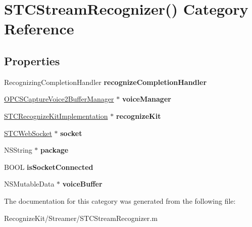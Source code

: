 \hypertarget{category_s_t_c_stream_recognizer_07_08}{}\section{S\+T\+C\+Stream\+Recognizer() Category Reference}
\label{category_s_t_c_stream_recognizer_07_08}
\subsection*{Properties}
\begin{DoxyCompactItemize}
\item 
\hypertarget{category_s_t_c_stream_recognizer_07_08_acbd8a13bbc49366b615f8d2462a12acc}{}\label{category_s_t_c_stream_recognizer_07_08_acbd8a13bbc49366b615f8d2462a12acc} 
Recognizing\+Completion\+Handler {\bfseries recognize\+Completion\+Handler}
\item 
\hypertarget{category_s_t_c_stream_recognizer_07_08_a059267852d040de574a1b94eed567d87}{}\label{category_s_t_c_stream_recognizer_07_08_a059267852d040de574a1b94eed567d87} 
\hyperlink{interface_o_p_c_s_capture_voice2_buffer_manager}{O\+P\+C\+S\+Capture\+Voice2\+Buffer\+Manager} $\ast$ {\bfseries voice\+Manager}
\item 
\hypertarget{category_s_t_c_stream_recognizer_07_08_a4436af5c54b139df184e39c5183bc541}{}\label{category_s_t_c_stream_recognizer_07_08_a4436af5c54b139df184e39c5183bc541} 
\hyperlink{interface_s_t_c_recognize_kit_implementation}{S\+T\+C\+Recognize\+Kit\+Implementation} $\ast$ {\bfseries recognize\+Kit}
\item 
\hypertarget{category_s_t_c_stream_recognizer_07_08_afc91c146cb77eaa94e99633057712357}{}\label{category_s_t_c_stream_recognizer_07_08_afc91c146cb77eaa94e99633057712357} 
\hyperlink{interface_s_t_c_web_socket}{S\+T\+C\+Web\+Socket} $\ast$ {\bfseries socket}
\item 
\hypertarget{category_s_t_c_stream_recognizer_07_08_ac071ff544cd75927eb8f7353897b29a9}{}\label{category_s_t_c_stream_recognizer_07_08_ac071ff544cd75927eb8f7353897b29a9} 
N\+S\+String $\ast$ {\bfseries package}
\item 
\hypertarget{category_s_t_c_stream_recognizer_07_08_a4b5c69802c26540ff2e602daeef69d84}{}\label{category_s_t_c_stream_recognizer_07_08_a4b5c69802c26540ff2e602daeef69d84} 
B\+O\+OL {\bfseries is\+Socket\+Connected}
\item 
\hypertarget{category_s_t_c_stream_recognizer_07_08_ad565b954bd4cc391a7fc0cebd949dac6}{}\label{category_s_t_c_stream_recognizer_07_08_ad565b954bd4cc391a7fc0cebd949dac6} 
N\+S\+Mutable\+Data $\ast$ {\bfseries voice\+Buffer}
\end{DoxyCompactItemize}


The documentation for this category was generated from the following file\+:\begin{DoxyCompactItemize}
\item 
Recognize\+Kit/\+Streamer/S\+T\+C\+Stream\+Recognizer.\+m\end{DoxyCompactItemize}
